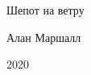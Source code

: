 \begin{center}
\begin{Huge}
Шепот на ветру\\
\end{Huge}
\vspace{1.5cm}
\begin{large}
Алан Маршалл\\
\end{large}
    \vspace{1.5cm}
2020\\
\end{center}

